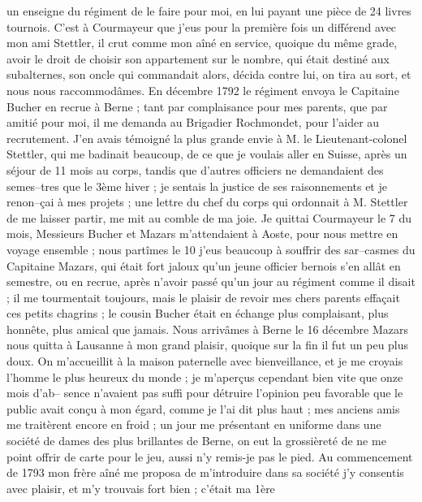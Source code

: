 \documentclass[12pt]{article}
\begin{document}
 un enseigne du régiment de le faire pour moi, en
lui payant une pièce de 24 livres tournois. C’est à Courmayeur que j’eus pour la première fois un
différend avec mon ami Stettler, il crut comme mon aîné en service, quoique du même grade, avoir le
droit de choisir son appartement sur le nombre, qui était destiné aux subalternes, son oncle qui
commandait alors, décida contre lui, on tira au sort, et nous nous raccommodâmes. En décembre 1792
le régiment envoya le Capitaine Bucher en recrue à Berne ; tant par complaisance pour mes parents,
que par amitié pour moi, il me demanda au Brigadier Rochmondet, pour l’aider au recrutement. J’en
avais témoigné la plus grande envie à M. le Lieutenant-colonel Stettler, qui me badinait beaucoup,
de ce que je voulais aller en Suisse, après un séjour de 11 mois au corps, tandis que d’autres
officiers ne demandaient des semes–tres que le 3ème hiver ; je sentais la justice de ses
raisonnements et je renon–çai à mes projets ; une lettre du chef du corps qui ordonnait à M.
Stettler de me laisser partir, me mit au comble de ma joie. Je quittai Courmayeur le 7 du mois,
Messieurs Bucher et Mazars m’attendaient à Aoste, pour nous mettre en voyage ensemble ; nous
partîmes le 10 j’eus beaucoup à souffrir des sar–casmes du Capitaine Mazars, qui était fort jaloux
qu’un jeune officier bernois s’en allât en semestre, ou en recrue, après n’avoir passé qu’un jour au
régiment comme il disait ; il me tourmentait toujours, mais le plaisir de revoir mes chers parents
effaçait ces petits chagrins ; le cousin Bucher était en échange plus complaisant, plus honnête,
plus amical que jamais. Nous arrivâmes à Berne le 16 décembre Mazars nous quitta à Lausanne à mon
grand plaisir, quoique sur la fin il fut un peu plus doux. On m’accueillit à la maison paternelle
avec bienveillance, et je me croyais l’homme le plus heureux du monde ; je m’aperçus cependant bien
vite que onze mois d’ab– sence n’avaient pas suffi pour détruire l’opinion peu favorable que le
public avait conçu à mon égard, comme je l’ai dit plus haut ; mes anciens amis me traitèrent encore
en froid ; un jour me présentant en uniforme dans une société de dames des plus brillantes de Berne,
on eut la grossièreté de ne me point offrir de carte pour le jeu, aussi n’y remis-je pas le pied. Au
commencement de 1793 mon frère aîné me proposa de m’introduire dans sa société j’y consentis avec
plaisir, et m’y trouvais fort bien ; c’était ma 1ère
\end{document}

